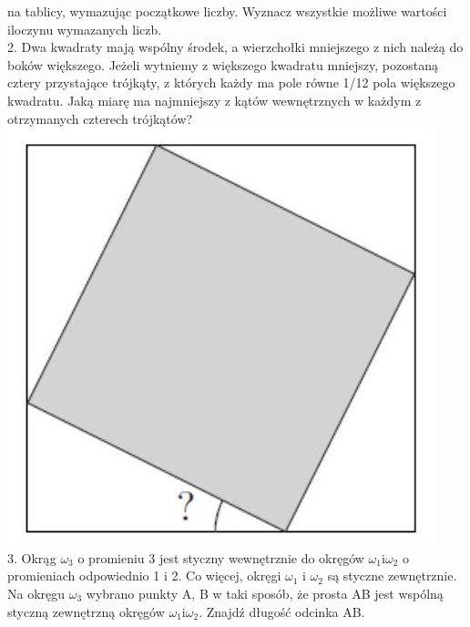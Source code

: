 \documentclass[10pt]{article}
\begin{document}
na tablicy, wymazując początkowe liczby. Wyznacz wszystkie możliwe wartości iloczynu wymazanych liczb.\\
2. Dwa kwadraty mają wspólny środek, a wierzchołki mniejszego z nich należą do boków większego. Jeżeli wytniemy z większego kwadratu mniejszy, pozostaną cztery przystające trójkąty, z których każdy ma pole równe 1/12 pola większego kwadratu. Jaką miarę ma najmniejszy z kątów wewnętrznych w każdym z otrzymanych czterech trójkątów?\\
\includegraphics[max width=\textwidth, center]{2024_11_21_8c76d2422a3a02e654d7g-1}\\
3. Okrąg \(\omega_{3}\) o promieniu 3 jest styczny wewnętrznie do okręgów \(\omega_{1} \mathrm{i} \omega_{2}\) o promieniach odpowiednio 1 i 2. Co więcej, okręgi \(\omega_{1}\) i \(\omega_{2}\) są styczne zewnętrznie. Na okręgu \(\omega_{3}\) wybrano punkty A, B w taki sposób, że prosta AB jest wspólną styczną zewnętrzną okręgów \(\omega_{1} \mathrm{i} \omega_{2}\). Znajdź długość odcinka AB.
\end{document}
